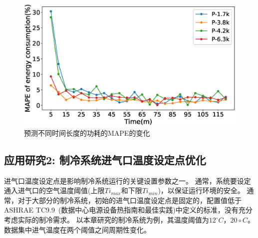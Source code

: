 

\begin{figure}
    \centering
    \includegraphics[width=0.8\linewidth]{figures/chapter4/power_error.eps}
    \caption{预测不同时间长度的功耗的MAPE的变化}
    \label{fig:mape_evolution}
\end{figure}




\subsection{应用研究2: 制冷系统进气口温度设定点优化}
\label{sub:case-study2}
进气口温度设定点是影响制冷系统运行的关键设置参数之一。
通常，系统要设定通入进气口的空气温度阈值(上限$Ti_{max}$和下限$Ti_{min}$)，以保证运行环境的安全。
通常，对于大部分的制冷系统，初始的进气口温度设定点是固定的，配置值低于ASHRAE TC9.9~\cite{ashraeTC992011}(数据中心电源设备热指南和最佳实践)中定义的标准，没有充分考虑实际的制冷需求。
以本章研究的制冷系统为例，其温度阈值为$12^\circ C$，$20\circ C$。
数据集中进气温度在两个阈值之间周期性变化。

